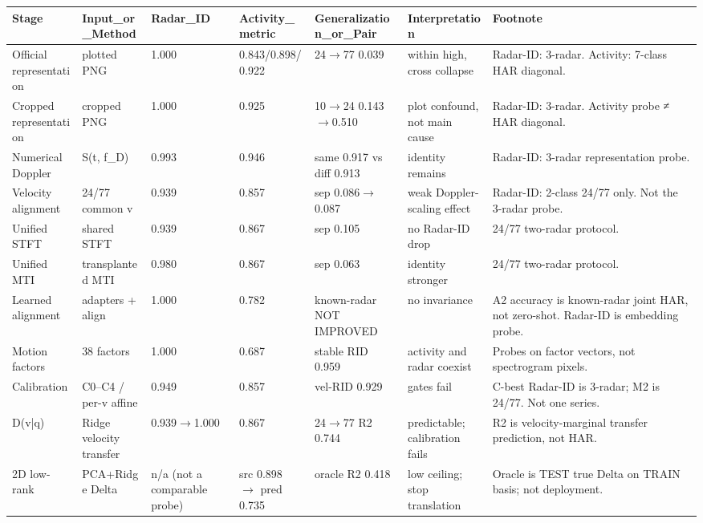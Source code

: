 \begin{tabular}{lllllll}
\hline
Stage & Input\_or\_Method & Radar\_ID & Activity\_metric & Generalization\_or\_Pair & Interpretation & Footnote \\
\hline
Official representation & plotted PNG & 1.000 & 0.843/0.898/0.922 & 24$\rightarrow$77 0.039 & within high, cross collapse & Radar-ID: 3-radar. Activity: 7-class HAR diagonal. \\
Cropped representation & cropped PNG & 1.000 & 0.925 & 10$\rightarrow$24 0.143$\rightarrow$0.510 & plot confound, not main cause & Radar-ID: 3-radar. Activity probe ≠ HAR diagonal. \\
Numerical Doppler & S(t, f\_D) & 0.993 & 0.946 & same 0.917 vs diff 0.913 & identity remains & Radar-ID: 3-radar representation probe. \\
Velocity alignment & 24/77 common v & 0.939 & 0.857 & sep 0.086$\rightarrow$0.087 & weak Doppler-scaling effect & Radar-ID: 2-class 24/77 only. Not the 3-radar probe. \\
Unified STFT & shared STFT & 0.939 & 0.867 & sep 0.105 & no Radar-ID drop & 24/77 two-radar protocol. \\
Unified MTI & transplanted MTI & 0.980 & 0.867 & sep 0.063 & identity stronger & 24/77 two-radar protocol. \\
Learned alignment & adapters + align & 1.000 & 0.782 & known-radar NOT IMPROVED & no invariance & A2 accuracy is known-radar joint HAR, not zero-shot. Radar-ID is embedding probe. \\
Motion factors & 38 factors & 1.000 & 0.687 & stable RID 0.959 & activity and radar coexist & Probes on factor vectors, not spectrogram pixels. \\
Calibration & C0–C4 / per-v affine & 0.949 & 0.857 & vel-RID 0.929 & gates fail & C-best Radar-ID is 3-radar; M2 is 24/77. Not one series. \\
D(v|q) & Ridge velocity transfer & 0.939$\rightarrow$1.000 & 0.867 & 24$\rightarrow$77 R2 0.744 & predictable; calibration fails & R2 is velocity-marginal transfer prediction, not HAR. \\
2D low-rank & PCA+Ridge Delta & n/a (not a comparable probe) & src 0.898 $\rightarrow$ pred 0.735 & oracle R2 0.418 & low ceiling; stop translation & Oracle is TEST true Delta on TRAIN basis; not deployment. \\
\hline
\end{tabular}

